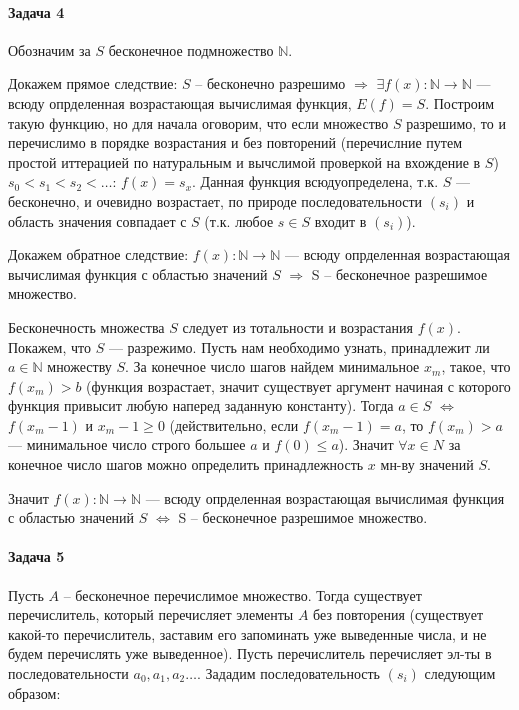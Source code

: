 \documentclass{article}
\newcommand{\N}{\mathbb{N}}
\begin{document}
	\paragraph{Задача 4}
		Обозначим за $S$ бесконечное подмножество $\N$.

        Докажем прямое следствие: $S$ -- бесконечно разрешимо $\Rightarrow$ $\exists f(x): \N \rightarrow \N$ --- всюду опрделенная возрастающая вычислимая функция, $E(f) = S$. Построим такую функцию, но для начала оговорим, что если множество $S$ разрешимо, то и перечислимо в порядке возрастания и без повторений (перечислние путем простой иттерацией по натуральным и вычслимой проверкой на вхождение в $S$) $s_0 < s_1 < s_2 < \ldots$: $f(x) = s_x$.
        Данная функция всюдуопределена, т.к. $S$ --- бесконечно, и очевидно возрастает, по природе последовательности $(s_i)$ и область значения совпадает с $S$ (т.к. любое $s\in S$  входит в $(s_i)$).

        Докажем обратное следствие: $f(x): \N \rightarrow \N$ --- всюду опрделенная возрастающая вычислимая функция с областью значений $S$ $\Rightarrow$ S -- бесконечное разрешимое множество.

        Бесконечность множества $S$ следует из тотальности и возрастания $f(x)$. Покажем, что $S$ --- разрежимо. Пусть нам необходимо узнать, принадлежит ли $a\in \N$ множеству $S$. За конечное число шагов найдем минимальное $x_m$, такое, что $f(x_m) > b$ (функция возрастает, значит существует аргумент начиная с которого функция привысит любую наперед заданную константу). Тогда $a \in S$ $\Leftrightarrow$ $f(x_m - 1)$ и $x_m - 1 \ge 0$ (действительно, если $f(x_m-1) = a$, то $f(x_m) > a$ --- минимальное число строго большее $a$ и $f(0) \le a$). Значит $\forall x \in N$ за конечное число шагов можно определить принадлежность $x$ мн-ву значений $S$.

        Значит $f(x): \N \rightarrow \N$ --- всюду опрделенная возрастающая вычислимая функция с областью значений $S$ $\Leftrightarrow$ S -- бесконечное разрешимое множество.

	\paragraph{Задача 5}
		Пусть $A$ -- бесконечное перечислимое множество. Тогда существует перечислитель, который перечисляет элементы $A$ без повторения (существует какой-то перечислитель, заставим его запоминать уже выведенные числа, и не будем перечислять уже выведенное). Пусть перечислитель перечисляет эл-ты в последовательности $a_0, a_1, a_2\ldots$. Зададим последовательность $(s_i)$ следующим образом:
\end{document}
